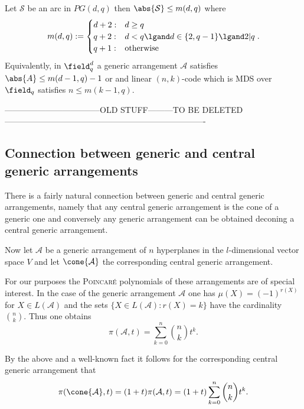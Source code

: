 \message{ !name(OnTheRAIDProblem.tex)}\documentclass[8pt,a4paper]{article}
\begin{document}
\begin{conjecture}
Let $\mathcal{S}$ be an arc in $PG(d,q)$ then $\abs{\mathcal{S}}\leq m(d,q)$ where
\begin{equation}
m(d,q):=\begin{cases}
d+2 :& d \geq q\\
q+2 :& d<q \lgand d\in\{2,q-1\} \lgand 2|q\\
q+1 :& \text{otherwise}
\end{cases}\text{.}
\end{equation} 
Equivalently, in $\field_q^d$ a generic arrangement $\mathcal{A}$ satisfies $\abs{A}\leq m(d-1,q)-1$ or and linear $(n,k)$-code which is MDS over $\field_q$ satisfies $n\leq m(k-1,q)$.
\end{conjecture}

-----------------------------------OLD STUFF---------TO BE DELETED-------------------------------------------------------------------------

\subsection{Connection between generic and central generic arrangements}

There is a fairly natural connection between generic and central generic arrangements, namely that any central generic arrangement is the cone of a generic one and conversely any generic arrangement can be obtained deconing a central generic arrangement.

Now let $\mathcal{A}$ be a generic arrangement of $n$ hyperplanes in the $l$-dimensional vector space $V$ and let $\cone{\mathcal{A}}$ the corresponding central generic arrangement.

For our purposes the \textsc{Poincaré} polynomials of these arrangements are of special interest.
In the case of the generic arrangement $\mathcal{A}$ one has $\mu(X)=(-1)^{r(X)}$ for $X\in L(\mathcal{A})$ and the sets $\{X\in L(\mathcal{A}):r(X)=k\}$ have the cardinality $\binom{n}{k}$. Thus one obtains
\begin{equation}
\pi(\mathcal{A},t)=\sum_{k=0}^n{\binom{n}{k}t^k}\text{.}
\end{equation}

By the above and a well-known fact it follows for the corresponding central generic arrangement that
\begin{equation}
\pi(\cone{\mathcal{A}},t)=(1+t)\pi(\mathcal{A},t)=(1+t)\sum_{k=0}^n{\binom{n}{k}t^k}\text{.}
\end{equation}
\end{document}
